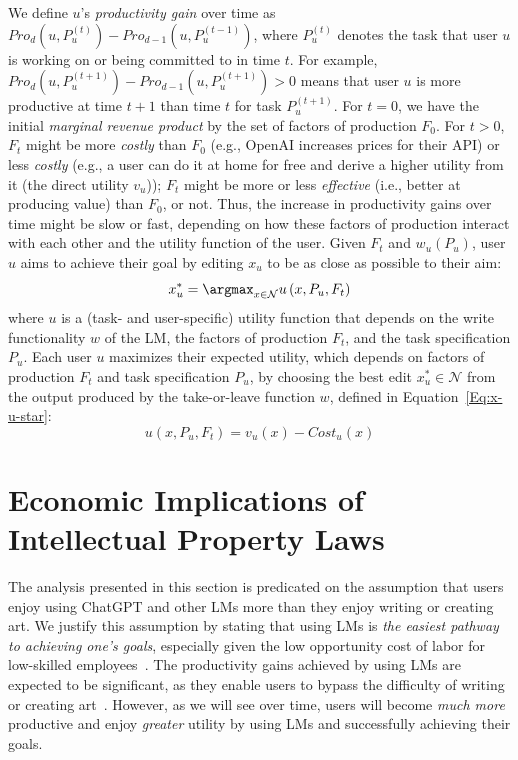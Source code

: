 {{We define $u$'s \textit{productivity gain} over time as $Pro_d(u, P_u^{(t)}) - Pro_{d-1}(u, P_u^{(t-1)})$, where $P_u^{(t)}$ denotes the task that user $u$ is working on or being committed to in time $t$.
For example, $Pro_d(u, P_u^{(t+1)}) - Pro_{d-1}(u , P_u^{(t+1)}) > 0$ means that user $u$ is more productive at time $t+1$ than time $t$ for task $P_u^{(t+1)}$.
For $t=0$, we have the initial \emph{marginal revenue product} by the set of factors of production $F_0$.
For $t>0$, $F_t$ might be more \emph{costly} than $F_0$ (e.g., OpenAI increases prices for their API) or less \emph{costly} (e.g., a user can do it at home for free and derive a higher utility from it (the direct utility $v_u$)); $F_t$ might be more or less \emph{effective} (i.e., better at producing value) than $F_0$, or not.
Thus, the increase in productivity gains over time might be slow or fast, depending on how these factors of production interact with each other and the utility function of the user.
Given $F_t$ and $w_u(P_u)$, user $u$ aims to achieve their goal by editing $x_u$ to be as close as possible to their aim:
\begin{equation}
    x^*_u = \argmax_{x \in \mathcal{N}} u \left( x, P_u, F_t \right)
    \label{Eq:x-u-star}
\end{equation}
where $u$ is a (task- and user-specific) utility function that depends on the write functionality $w$ of the LM, the factors of production $F_t$, and the task specification $P_u$.
Each user $u$ maximizes their expected utility, which depends on factors of production $F_t$ and task specification $P_u$, by choosing the best edit $x^*_u \in \mathcal{N}$ from the output produced by the take-or-leave function $w$, defined in Equation~\ref{Eq:x-u-star}:
\begin{equation}
    u\left( x, P_u, F_t \right) = v_u \left( x \right) - Cost_u \left( x \right)
\end{equation}


\section{Economic Implications of Intellectual Property Laws}

\label{IPlaws}

The analysis presented in this section is predicated on the assumption that users enjoy using ChatGPT and other LMs more than they enjoy writing or creating art.
We justify this assumption by stating that using LMs is \emph{the easiest pathway to achieving one's goals}, especially given the low opportunity cost of labor for low-skilled employees~\citep{autor2015there}.
The productivity gains achieved by using LMs are expected to be significant, as they enable users to bypass the difficulty of writing or creating art~\citep{langley00}.
However, as we will see over time, users will become \emph{much more} productive and enjoy \emph{greater} utility by using LMs and successfully achieving their goals.
}}
